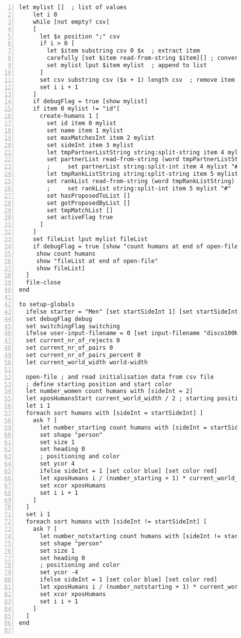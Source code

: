 \begin{lstlisting}[numbers=left, breaklines=true]
    let mylist []  ; list of values
    let i 0
    while [not empty? csv]
    [
      let $x position ";" csv
      if i > 0 [
        let $item substring csv 0 $x  ; extract item
        carefully [set $item read-from-string $item][] ; convert if number
        set mylist lput $item mylist  ; append to list
      ]
      set csv substring csv ($x + 1) length csv  ; remove item and comma
      set i i + 1
    ]
    if debugFlag = true [show mylist]
    if item 0 mylist != "id"[
      create-humans 1 [
        set id item 0 mylist
        set name item 1 mylist
        set maxMatchesInt item 2 mylist
        set sideInt item 3 mylist
        let tmpPartnerListString string:split-string item 4 mylist "#"
        set partnerList read-from-string (word tmpPartnerListString)
        ;     set partnerList string:split-int item 4 mylist "#"
        let tmpRankListString string:split-string item 5 mylist "#"
        set rankList read-from-string (word tmpRankListString)
        ;     set rankList string:split-int item 5 mylist "#"
        set hasProposedToList []
        set gotProposedByList []
        set tmpMatchList []
        set activeFlag true
      ]
    ]
    set fileList lput mylist fileList
    if debugFlag = true [show "count humans at end of open-file"
     show count humans
     show "fileList at end of open-file"
     show fileList]
  ]
  file-close
end

to setup-globals
  ifelse starter = "Men" [set startSideInt 1] [set startSideInt 2]
  set debugFlag debug
  set switchingFlag switching
  ifelse user-input-filename = 0 [set input-filename "disco100NotPicky"] [set input-filename user-input-filename]
  set current_nr_of_rejects 0
  set current_nr_of_pairs 0
  set current_nr_of_pairs_percent 0
  let current_world_width world-width

  open-file ; and read initialisation data from csv file
  ; define starting position and start color
  let number_women count humans with [sideInt = 2]
  let xposHumansStart current_world_width / 2 ; starting position for humans
  let i 1
  foreach sort humans with [sideInt = startSideInt] [
    ask ? [
      let number_starting count humans with [sideInt = startSideInt]
      set shape "person"
      set size 1
      set heading 0
      ; positioning and color
      set ycor 4
      ifelse sideInt = 1 [set color blue] [set color red]
      let xposHumans i / (number_starting + 1) * current_world_width - xposHumansStart
      set xcor xposHumans
      set i i + 1
    ]
  ]
  set i 1
  foreach sort humans with [sideInt != startSideInt] [
    ask ? [
      let number_notstarting count humans with [sideInt != startSideInt]
      set shape "person"
      set size 1
      set heading 0
      ; positioning and color
      set ycor -4
      ifelse sideInt = 1 [set color blue] [set color red]
      let xposHumans i / (number_notstarting + 1) * current_world_width - xposHumansStart
      set xcor xposHumans
      set i i + 1
    ]
  ]
end


\end{lstlisting}
